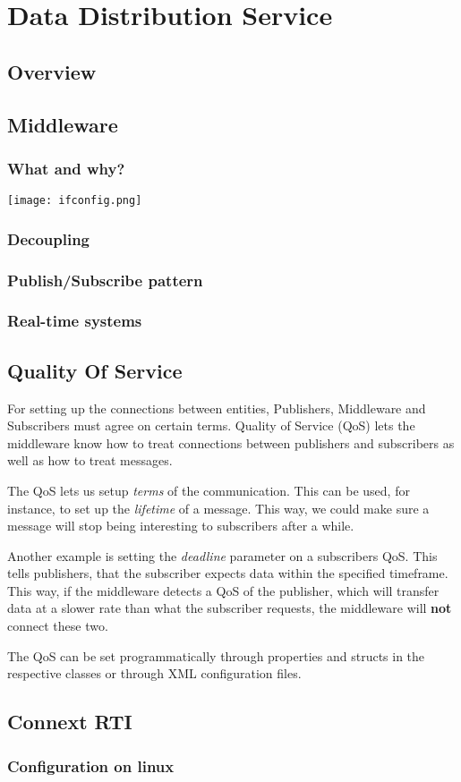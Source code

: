 \chapter{Data Distribution Service}
\section{Overview}


\section{Middleware}
\subsection{What and why?}


\begin{center}
	\texttt{[image: ifconfig.png]}
\end{center}

\subsection{Decoupling}



\subsection{Publish/Subscribe pattern}


\subsection{Real-time systems}

\section{Quality Of Service}
For setting up the connections between entities, Publishers, Middleware and Subscribers must agree on certain terms. Quality of Service (QoS) lets the middleware know how to treat connections between publishers and subscribers as well as how to treat messages.

The QoS lets us setup \textit{terms} of the communication. This can be used, for instance, to set up the \textit{lifetime} of a message. This way, we could make sure a message will stop being interesting to subscribers after a while. 

Another example is setting the \textit{deadline} parameter on a subscribers QoS. This tells publishers, that the subscriber expects data within the specified timeframe. This way, if the middleware detects a QoS of the publisher, which will transfer data at a slower rate than what the subscriber requests, the middleware will \textbf{not} connect these two.

The QoS can be set programmatically through properties and structs in the respective classes or through XML configuration files. 



\section{Connext RTI}

\subsection{Configuration on linux}